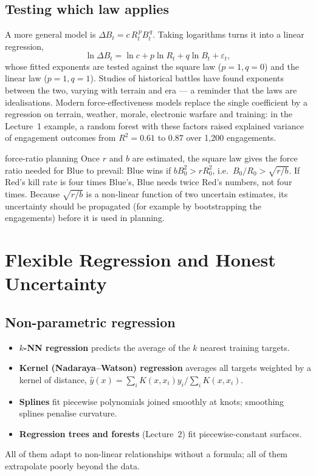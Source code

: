 \documentclass[11pt]{article}
\begin{document}
\subsection{Testing which law applies}
A more general model is $\Delta B_t=c\,R_t^{\,p}B_t^{\,q}$. Taking logarithms turns it into a linear regression,
\[\ln\Delta B_t=\ln c+p\ln R_t+q\ln B_t+\varepsilon_t,\]
whose fitted exponents are tested against the square law ($p=1,q=0$) and the linear law ($p=1,q=1$). Studies of historical battles have found exponents between the two, varying with terrain and era --- a reminder that the laws are idealisations. Modern force-effectiveness models replace the single coefficient by a regression on terrain, weather, morale, electronic warfare and training: in the Lecture~1 example, a random forest with these factors raised explained variance of engagement outcomes from $R^2=0.61$ to $0.87$ over 1,200 engagements.
\begin{defence}{force-ratio planning}
Once $r$ and $b$ are estimated, the square law gives the force ratio needed for Blue to prevail: Blue wins if $bB_0^2>rR_0^2$, i.e.\ $B_0/R_0>\sqrt{r/b}$. If Red's kill rate is four times Blue's, Blue needs twice Red's numbers, not four times. Because $\sqrt{r/b}$ is a non-linear function of two uncertain estimates, its uncertainty should be propagated (for example by bootstrapping the engagements) before it is used in planning.
\end{defence}

\section{Flexible Regression and Honest Uncertainty}
\subsection{Non-parametric regression}
\begin{itemize}
\item \textbf{$k$-NN regression} predicts the average of the $k$ nearest training targets.
\item \textbf{Kernel (Nadaraya--Watson) regression} averages all targets weighted by a kernel of distance, $\hat y(x)=\sum_iK(x,x_i)y_i/\sum_iK(x,x_i)$.
\item \textbf{Splines} fit piecewise polynomials joined smoothly at knots; smoothing splines penalise curvature.
\item \textbf{Regression trees and forests} (Lecture~2) fit piecewise-constant surfaces.
\end{itemize}
All of them adapt to non-linear relationships without a formula; all of them extrapolate poorly beyond the data.
\end{document}
